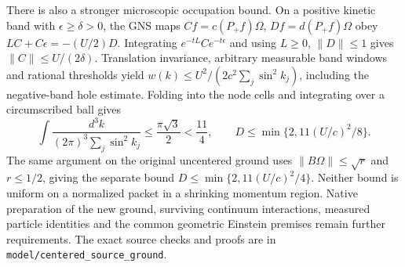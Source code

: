 There is also a stronger microscopic occupation bound. On a positive
kinetic band with $\epsilon\ge\delta>0$, the GNS maps
$Cf=c(P_+f)\Omega$, $Df=d(P_+f)\Omega$ obey
$LC+C\epsilon=-(U/2)D$. Integrating
$e^{-tL}Ce^{-t\epsilon}$ and using $L\ge0$, $\|D\|\le1$ gives
$\|C\|\le U/(2\delta)$. Translation invariance, arbitrary measurable
band windows and rational thresholds yield
$w(k)\le U^2/(2c^2\sum_j\sin^2k_j)$, including the negative-band
hole estimate. Folding into the node cells and integrating over a
circumscribed ball gives
\[
 \int\frac{d^3k}{(2\pi)^3\sum_j\sin^2k_j}
 \le\frac{\pi\sqrt3}{2}<\frac{11}{4},\qquad
 D\le\min\{2,11(U/c)^2/8\}.
\]
The same argument on the original uncentered ground uses
$\|B\Omega\|\le\sqrt r$ and $r\le1/2$, giving the separate bound
$D\le\min\{2,11(U/c)^2/4\}$. Neither bound is uniform on a normalized
packet in a shrinking momentum region. Native preparation of the new
ground, surviving continuum interactions, measured particle identities
and the common geometric Einstein premises remain further requirements.
The exact source checks and proofs are in
\texttt{model/centered\_source\_ground}.
